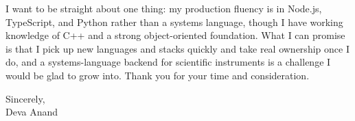 \documentclass[letterpaper,11pt]{article}
\begin{document}
I want to be straight about one thing: my production fluency is in Node.js, TypeScript, and Python rather than a systems language, though I have working knowledge of C++ and a strong object-oriented foundation. What I can promise is that I pick up new languages and stacks quickly and take real ownership once I do, and a systems-language backend for scientific instruments is a challenge I would be glad to grow into. Thank you for your time and consideration.

\vspace{6pt}

\noindent Sincerely,\\
Deva Anand
\end{document}
